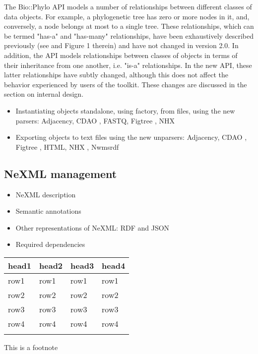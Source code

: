 \documentclass{bioinfo}
\begin{document}
The Bio::Phylo API models a number of relationships between different classes of data 
objects. For example, a phylogenetic tree has zero or more nodes in it, and, conversely, 
a node belongs at most to a single tree. These relationships, which can be termed "has-a" 
and "has-many" relationships, have been exhaustively described previously (see 
\citet{Vos2011} and Figure 1 therein) and have not changed in version 2.0. In addition, 
the API models relationships between classes of objects in terms of their inheritance from 
one another, i.e. "is-a" relationships. In the new API, these latter relationships have 
subtly changed, although this does not affect the behavior experienced by users of the 
toolkit. These changes are discussed in the section on internal design.

\begin{itemize}
\item Instantiating objects standalone, using factory, from files, using the new parsers: 
Adjacency, CDAO \citep{prosdocimi2009initial}, FASTQ, Figtree \citep{rambaut2007figtree}, 
NHX \citep{zmasek2001atv}
\item Exporting objects to text files using the new unparsers: Adjacency, CDAO 
\citep{prosdocimi2009initial}, Figtree \citep{rambaut2007figtree}, HTML, NHX 
\citep{zmasek2001atv}, Nwmsrdf
\end{itemize}

\subsection{NeXML management}

\begin{itemize}
\item NeXML description
\item Semantic annotations
\item Other representations of NeXML: RDF and JSON
\item Required dependencies
\end{itemize}

\begin{table}[!t]
 {\begin{tabular}{@{}llll@{}}\toprule head1 &
head2 & head3 & head4\\\midrule
row1 & row1 & row1 & row1\\
row2 & row2 & row2 & row2\\
row3 & row3 & row3 & row3\\
row4 & row4 & row4 & row4\\\botrule
\end{tabular}}{This is a footnote}
\end{table}
\end{document}
